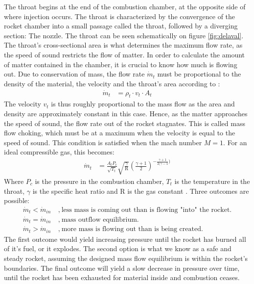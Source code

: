 	The throat begins at the end of the combustion chamber, at the opposite side of where injection occurs. The throat is characterized by the convergence of the rocket chamber into a small passage called the throat, followed by a diverging section: The nozzle. The throat can be seen schematically on figure \ref{fig:delaval}. The throat's cross-sectional area is what determines the maximum flow rate, as the speed of sound restricts the flow of matter. In order to calculate the amount of matter contained in the chamber, it is crucial to know how much is flowing out. Due to conservation of mass, the flow rate $\dot{m}_t$ must be proportional to the density of the material, the velocity and the throat's area according to \cite{nasacompflow}:
		\begin{align}
			\dot{m}_t &= \rho_t \cdot v_t \cdot A_t
		\end{align}
		The velocity $v_t$ is thus roughly proportional to the mass flow as the area and density are approximately constant in this case. Hence, as the matter approaches the speed of sound, the flow rate out of the rocket stagnates. This is called mass flow choking, which must be at a maximum when the velocity is equal to the speed of sound. This condition is satisfied when the mach number $M=1$. For an ideal compressible gas, this becomes:
		\begin{align}
			\dot{m}_t &= \frac{A_t P_c}{\sqrt{T_t}} \sqrt{\frac{\gamma}{\text{R}}} \left(\frac{\gamma+1}{2}\right)^{-\frac{\gamma+1}{2(\gamma-1})}
		\end{align}
	Where $P_c$ is the pressure in the combustion chamber, $T_t$ is the temperature in the throat, $\gamma$ is the specific heat ratio and R is the gas constant \cite{nasacompflow}. Three outcomes are possible:
	\begin{align*}
		\dot{m}_t < \dot{m}_{in} & ~,~ \text{less mass is coming out than is flowing "into" the rocket.} \\
		\dot{m}_t = \dot{m}_{in} & ~,~ \text{mass outflow equilibrium.} \\
		\dot{m}_t > \dot{m}_{in} & ~,~ \text{more mass is flowing out than is being created.}
	\end{align*}
	The first outcome would yield increasing pressure until the rocket has burned all of it's fuel, or it explodes. The second option is what we know as a safe and steady rocket, assuming the designed mass flow equilibrium is within the rocket's boundaries. The final outcome will yield a slow decrease in pressure over time, until the rocket has been exhausted for material inside and combustion ceases. 

